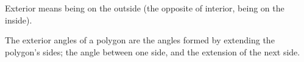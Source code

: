 Exterior means being on the outside (the opposite of interior, being on the inside).
\par
The exterior angles of a polygon are the angles formed by extending the polygon's 
sides; the angle between one side, and the extension of the next side.